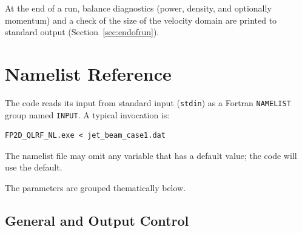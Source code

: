 \documentclass[11pt,a4paper]{article}
\begin{document}
At the end of a run, balance diagnostics (power, density, and optionally
momentum) and a check of the size of the velocity domain are printed to
standard output (Section~\ref{sec:endofrun}).

\section{Namelist Reference}
\label{sec:namelist}

The code reads its input from standard input (\texttt{stdin}) as a Fortran
\texttt{NAMELIST} group named \texttt{INPUT}.  A typical invocation is:
\begin{lstlisting}
FP2D_QLRF_NL.exe < jet_beam_case1.dat
\end{lstlisting}
The namelist file may omit any variable that has a default value; the code
will use the default.

\bigskip
The parameters are grouped thematically below.

\subsection{General and Output Control}
\end{document}
